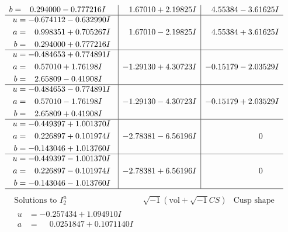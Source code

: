 \documentclass[1p]{elsarticle_modified}
\theoremstyle{definition}
\newcommand{\I}{\sqrt{-1}}
\begin{document}
$$\begin{array}{c|c|c}
\begin{aligned}
b &= \phantom{-}0.294000 - 0.777216 I\end{aligned}
 & \phantom{-}1.67010 + 2.19825 I & \phantom{-}4.55384 - 3.61625 I \\ \hline\begin{aligned}
u &= -0.674112 - 0.632990 I \\
a &= \phantom{-}0.998351 + 0.705267 I \\
b &= \phantom{-}0.294000 + 0.777216 I\end{aligned}
 & \phantom{-}1.67010 - 2.19825 I & \phantom{-}4.55384 + 3.61625 I \\ \hline\begin{aligned}
u &= -0.484653 + 0.774891 I \\
a &= \phantom{-}0.57010 + 1.76198 I \\
b &= \phantom{-}2.65809 - 0.41908 I\end{aligned}
 & -1.29130 + 4.30723 I & -0.15179 - 2.03529 I \\ \hline\begin{aligned}
u &= -0.484653 - 0.774891 I \\
a &= \phantom{-}0.57010 - 1.76198 I \\
b &= \phantom{-}2.65809 + 0.41908 I\end{aligned}
 & -1.29130 - 4.30723 I & -0.15179 + 2.03529 I \\ \hline\begin{aligned}
u &= -0.449397 + 1.001370 I \\
a &= \phantom{-}0.226897 + 0.101974 I \\
b &= -0.143046 + 1.013760 I\end{aligned}
 & -2.78381 - 6.56196 I & \phantom{-0.000000 } 0 \\ \hline\begin{aligned}
u &= -0.449397 - 1.001370 I \\
a &= \phantom{-}0.226897 - 0.101974 I \\
b &= -0.143046 - 1.013760 I\end{aligned}
 & -2.78381 + 6.56196 I & \phantom{-0.000000 } 0\\
 \hline 
 \end{array}$$\newpage$$\begin{array}{c|c|c}  
\text{Solutions to }I^u_{2}& \I (\text{vol} + \sqrt{-1}CS) & \text{Cusp shape}\\
 \hline 
\begin{aligned}
u &= -0.257434 + 1.094910 I \\
a &= \phantom{-}0.0251847 + 0.1071140 I \\

\end{aligned}
\end{array}$$
\end{document}
